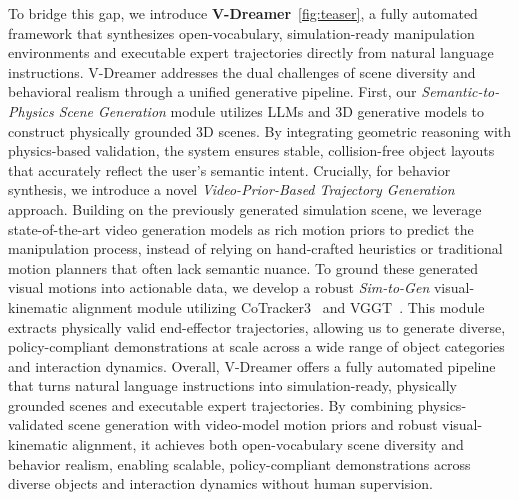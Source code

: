 To bridge this gap, we introduce \textbf{V-Dreamer}~\ref{fig:teaser}, a fully automated framework that synthesizes open-vocabulary, simulation-ready manipulation environments and executable expert trajectories directly from natural language instructions. V-Dreamer addresses the dual challenges of scene diversity and behavioral realism through a unified generative pipeline. 
First, our \textit{Semantic-to-Physics Scene Generation} module utilizes LLMs and 3D generative models to construct physically grounded 3D scenes. By integrating geometric reasoning with physics-based validation, the system ensures stable, collision-free object layouts that accurately reflect the user's semantic intent.
Crucially, for behavior synthesis, we introduce a novel \textit{Video-Prior-Based Trajectory Generation} approach. Building on the previously generated simulation scene, we leverage state-of-the-art video generation models as rich motion priors to predict the manipulation process, instead of relying on hand-crafted heuristics or traditional motion planners that often lack semantic nuance.
To ground these generated visual motions into actionable data, we develop a robust \textit{Sim-to-Gen} visual-kinematic alignment module utilizing CoTracker3~\cite{karaev2023cotracker} and VGGT~\cite{wang2025vggt}. This module extracts physically valid end-effector trajectories, allowing us to generate diverse, policy-compliant demonstrations at scale across a wide range of object categories and interaction dynamics. Overall, V-Dreamer offers a fully automated pipeline that turns natural language instructions into simulation-ready, physically grounded scenes and executable expert trajectories. By combining physics-validated scene generation with video-model motion priors and robust visual-kinematic alignment, it achieves both open-vocabulary scene diversity and behavior realism, enabling scalable, policy-compliant demonstrations across diverse objects and interaction dynamics without human supervision.

